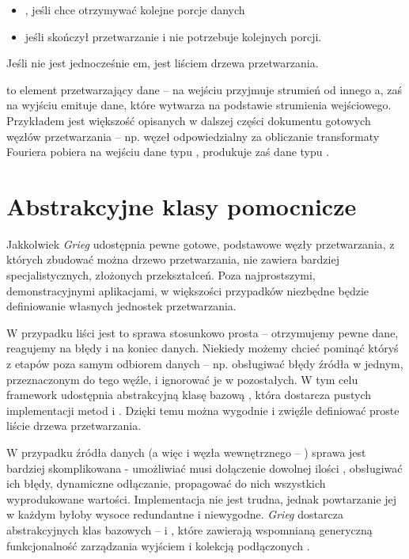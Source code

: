 \begin{itemize}

  \item {}, jeśli  chce otrzymywać kolejne porcje danych

  \item {} jeśli  skończył przetwarzanie i nie potrzebuje kolejnych
    porcji.

\end{itemize}

Jeśli  nie jest jednocześnie em, jest liściem drzewa przetwarzania.

 to element przetwarzający dane -- na wejściu przyjmuje strumień od innego
a, zaś na wyjściu emituje dane, które wytwarza na podstawie strumienia wejściowego.
Przykładem  jest większość opisanych w dalszej części dokumentu gotowych węzłów
przetwarzania -- np. węzeł odpowiedzialny za obliczanie transformaty Fouriera pobiera na wejściu
dane typu , produkuje zaś dane typu .


\section{Abstrakcyjne klasy pomocnicze}

Jakkolwiek \emph{Grieg} udostępnia pewne gotowe, podstawowe węzły przetwarzania, z których zbudować
można drzewo przetwarzania, nie zawiera bardziej specjalistycznych, złożonych przekształceń. Poza
najprostszymi, demonstracyjnymi aplikacjami, w większości przypadków niezbędne będzie definiowanie
własnych jednostek przetwarzania.

W przypadku liści jest to sprawa stosunkowo prosta -- otrzymujemy pewne dane, reagujemy na błędy i
na koniec danych. Niekiedy możemy chcieć pominąć któryś z etapów poza samym odbiorem danych -- np.
obsługiwać błędy źródła w jednym, przeznaczonym do tego węźle, i ignorować je w pozostałych. W tym
celu framework udostępnia abstrakcyjną klasę bazową , która dostarcza pustych
implementacji metod  i . Dzięki temu można wygodnie i zwięźle definiować
proste liście drzewa przetwarzania.

W przypadku źródła danych (a więc i węzła wewnętrznego -- ) sprawa jest bardziej
skomplikowana - umożliwiać musi dołączenie dowolnej ilości , obsługiwać ich błędy,
dynamiczne odłączanie, propagować do nich wszystkich wyprodukowane wartości. Implementacja nie jest
trudna, jednak powtarzanie jej w każdym  byłoby wysoce redundantne i niewygodne.
\emph{Grieg} dostarcza abstrakcyjnych klas bazowych --  i
, które zawierają wspomnianą generyczną funkcjonalność zarządzania wyjściem
i kolekcją podłączonych .

